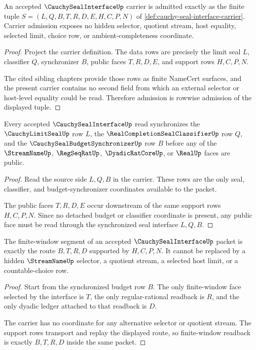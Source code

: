 \begin{theorem}
\label{thm:cauchy-seal-interface-carrier-admission}
An accepted $\CauchySealInterfaceUp$ carrier is admitted exactly as the finite tuple $S=(L,Q,B,T,R,D,E,H,C,P,N)$ of \autoref{def:cauchy-seal-interface-carrier}. Carrier admission exposes no hidden selector, quotient stream, host equality, selected limit, choice row, or ambient-completeness coordinate.
\end{theorem}
\begin{proof}
Project the carrier definition. The data rows are precisely the limit seal $L$, classifier $Q$, synchronizer $B$, public faces $T,R,D,E$, and support rows $H,C,P,N$.

The cited sibling chapters provide those rows as finite NameCert surfaces, and the present carrier contains no second field from which an external selector or host-level equality could be read. Therefore admission is rowwise admission of the displayed tuple.
\end{proof}

\begin{theorem}
\label{thm:cauchy-seal-interface-seal-synchronization}
Every accepted $\CauchySealInterfaceUp$ read synchronizes the $\CauchyLimitSealUp$ row $L$, the $\RealCompletionSealClassifierUp$ row $Q$, and the $\CauchySealBudgetSynchronizerUp$ row $B$ before any of the $\StreamNameUp$, $\RegSeqRatUp$, $\DyadicRatCoreUp$, or $\RealUp$ faces are public.
\end{theorem}
\begin{proof}
Read the source side $L,Q,B$ in the carrier. These rows are the only seal, classifier, and budget-synchronizer coordinates available to the packet.

The public faces $T,R,D,E$ occur downstream of the same support rows $H,C,P,N$. Since no detached budget or classifier coordinate is present, any public face must be read through the synchronized seal interface $L,Q,B$.
\end{proof}

\begin{theorem}
\label{thm:cauchy-seal-interface-finite-window-readback}
The finite-window segment of an accepted $\CauchySealInterfaceUp$ packet is exactly the route $B,T,R,D$ supported by $H,C,P,N$. It cannot be replaced by a hidden $\StreamNameUp$ selector, a quotient stream, a selected host limit, or a countable-choice row.
\end{theorem}
\begin{proof}
Start from the synchronized budget row $B$. The only finite-window face selected by the interface is $T$, the only regular-rational readback is $R$, and the only dyadic ledger attached to that readback is $D$.

The carrier has no coordinate for any alternative selector or quotient stream. The support rows transport and replay the displayed route, so finite-window readback is exactly $B,T,R,D$ inside the same packet.
\end{proof}

